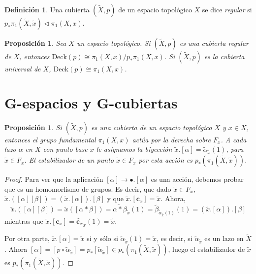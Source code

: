 \documentclass[12pt,a4paper]{book}
\newtheorem{prop}[thm]{Proposición}
\theoremstyle{definition} \newtheorem{defn}[thm]{Definición}
\theoremstyle{definition} \newtheorem{ejemplo}[thm]{Ejemplo}
\theoremstyle{definition} \newtheorem{ejercicio}[thm]{Ejercicio}
\theoremstyle{remark} \newtheorem*{obs}{Observación}
\def\cc{\mathbf{c}}
\def\gf{\pi_1}
\def\XX{\tilde{X}}
\def\xx{\tilde{x}}
\def\DD{\mathrm{Deck}}
\begin{document}
\begin{defn}
  Una cubierta $(\XX,p)$ de un espacio topológico $X$ se dice \emph{regular} si $p_*\gf(\XX,\xx)\lhd \gf(X,x)$.  
\end{defn}

\begin{prop}\label{reguni}
  Sea $X$ un espacio topológico. Si $(\XX,p)$ es una cubierta regular de $X$, entonces $\DD(p)\cong \gf(X,x)/p_*\gf(X,x)$. Si $(\XX,p)$ es la cubierta universal de $X$, $\DD(p)\cong \gf(X,x)$.
\end{prop}

\section{G-espacios y G-cubiertas}
\begin{prop}\label{actuafibra}
  Si $(\XX,p)$ es una cubierta de un espacio topológico $X$ y $x\in X$, entonces el grupo fundamental $\gf(X,x)$ actúa por la derecha sobre $F_x$. A cada lazo $\alpha$ en $X$ con punto base $x$ le asignamos la biyección $\xx.[\alpha]=\tilde{\alpha}_{\xx}(1)$, para $\xx \in F_x$. El estabilizador de un punto $\xx\in F_x$ por esta acción es $p_*(\gf(\XX,\xx))$.
\end{prop}
\begin{proof}
  Para ver que la aplicación $[\alpha]\rightarrow \bullet.[\alpha]$ es una acción, debemos probar que es un homomorfismo de grupos. Es decir, que dado $\xx\in F_x$, $\xx.([\alpha][\beta])=(\xx.[\alpha]).[\beta]$ y que $\xx.[\cc_x]=\xx$. Ahora,
  \begin{equation*}
    \xx.([\alpha][\beta])=\xx([\alpha*\beta])=\widetilde{\alpha*\beta}_{\xx}(1)=\tilde{\beta}_{\tilde{\alpha}_{\xx}(1)}(1)=(\xx.[\alpha]).[\beta]
  \end{equation*}
  mientras que $\xx.[\cc_x]=\tilde{\cc_x}_{\xx}(1)=\xx$.

  Por otra parte, $\xx.[\alpha]=\xx$ si y sólo si $\tilde{\alpha}_{\xx}(1)=\xx$, es decir, si $\tilde{\alpha}_{\xx}$ es un lazo en $\XX$. Ahora $[\alpha]=[p\circ \tilde{\alpha}_{\xx}]=p_*[\tilde{\alpha}_{\xx}]\in p_*(\gf(\XX,\xx))$, luego el estabilizador de $\xx$ es $p_*(\gf(\XX,\xx))$.
\end{proof}
\end{document}
